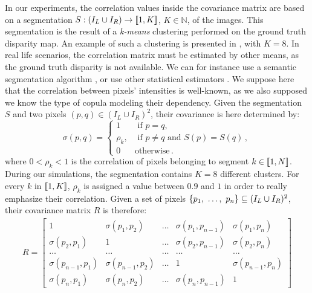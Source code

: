 In our experiments, the correlation values inside the covariance matrix are based on a segmentation $S:(I_L\cup I_R)\rightarrow[\![1,K]\!]$, $K\in\mathbb{N}$, of the images. This segmentation is the result of a \textit{k-means} clustering performed on the ground truth disparity map. An example of such a clustering is presented in , with $K=8$. In real life scenarios, the correlation matrix must be estimated by other means, as the ground truth disparity is not available. We can for instance use a semantic segmentation algorithm \cite{hariharan_hypercolumns_2014,ronneberger_u-net_2015}, or use other statistical estimators \cite{touloumis_nonparametric_2015}. We suppose here that the correlation between pixels' intensities is well-known, as we also supposed we know the type of copula modeling their dependency. Given the segmentation $S$ and two pixels $(p, q)\in(I_L\cup I_R)^2$, their covariance is here determined by:
\begin{equation}\label{eq:correlation}
    \sigma(p, q) =
    \begin{cases}
        1 &\text{ if }p=q,\\
        \rho_k, &\text{ if } p\ne q\text{ and }S(p)=S(q)\,, \\
        0 & \text{otherwise}\,.
    \end{cases}
\end{equation}
where $0<\rho_k<1$ is the correlation of pixels belonging to segment $k\in[\![ 1, N]\!]$. During our simulations, the segmentation contains $K=8$ different clusters. For every $k$ in $[\![1,K]\!]$, $\rho_k$ is assigned a value between $0.9$ and $1$ in order to really emphasize their correlation. Given a set of pixels $\{p_1 , ~\ldots, ~ p_n\}\subseteq(I_L\cup I_R)^2$, their covariance matrix $R$ is therefore:
\begin{align}\label{eq:correlation_matrix}
    R = \begin{bmatrix}
        1 & \sigma(p_{1}, p_{2}) & \ldots & \sigma(p_{1}, p_{n-1}) & \sigma(p_{1}, p_{n})\\
        \sigma(p_{2}, p_{1}) & 1 & \ldots & \sigma(p_{2}, p_{n-1}) & \sigma(p_{2}, p_{n})\\
        \ldots & \ldots & \ldots & \ldots & \ldots\\
        \sigma(p_{n-1}, p_{1}) & \sigma(p_{n-1}, p_{2}) & \ldots & 1 & \sigma(p_{n-1}, p_{n})\\
        \sigma(p_{n}, p_{1}) & \sigma(p_{n}, p_{2}) & \ldots & \sigma(p_{n}, p_{n-1}) & 1
    \end{bmatrix}
\end{align}

